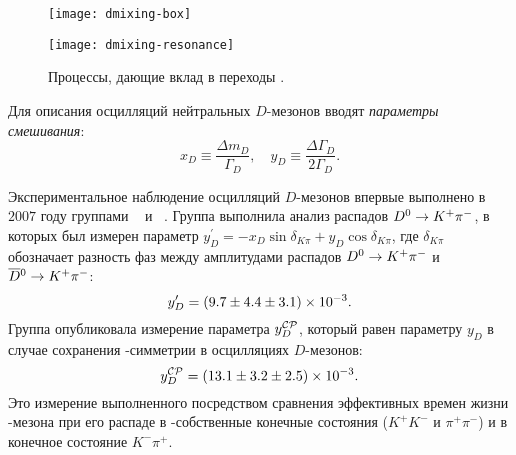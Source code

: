 \begin{figure}[htb]
 \centering
 \begin{minipage}[b]{0.49\textwidth}
  \centering
  \texttt{[image: dmixing-box]}
  \subcaption{}
  \label{fig:dmixing-box}
 \end{minipage}
 \begin{minipage}[b]{0.49\textwidth}
  \centering
  \texttt{[image: dmixing-resonance]}
  \subcaption{}
  \label{fig:dmixing-resonance}
 \end{minipage}
 \caption{Процессы, дающие вклад в переходы \dtodbar.}
 \label{fig:charm-mixing}
\end{figure}

Для описания осцилляций нейтральных $D$-мезонов вводят \emph{параметры смешивания}:
\begin{equation}
 x_D \equiv \frac{\Delta m_D}{\Gamma_D},\quad
 y_D \equiv \frac{\Delta\Gamma_D}{2\Gamma_D}.
\end{equation}

Экспериментальное наблюдение осцилляций $D$-мезонов впервые выполнено в $2007$ году группами \babar~\cite{babar_charm_mixing_observation} и \belle~\cite{belle_charm_mixing_observation}.  Группа \babar выполнила анализ распадов $D^0\to K^+\pi^-$, в которых был измерен параметр $y_D^{\prime} = -x_D\sin\delta_{K\pi} + y_D\cos\delta_{K\pi}$, где $\delta_{K\pi}$ обозначает разность фаз между амплитудами распадов $D^0\to K^+\pi^-$ и $\overline{D}{}^0\to K^+\pi^-$:
\begin{equation}
 y_D^{\prime} = \left( 9.7\pm4.4 \pm 3.1 \right) \times 10^{-3}.
\end{equation}
Группа \belle опубликовала измерение параметра $y_D^{\mathcal{CP}}$, который равен параметру $y_D$ в случае сохранения \cpconj-симметрии в осцилляциях $D$-мезонов:
\begin{equation}
  y_D^{\mathcal{CP}} = \left( 13.1\pm3.2\pm2.5 \right) \times 10^{-3}.
\end{equation}
Это измерение выполненного посредством сравнения эффективных времен жизни \dn-мезона при его распаде в \cpconj-собственные конечные состояния ($K^+K^-$ и $\pi^+\pi^-$) и в конечное состояние $K^-\pi^+$. %


